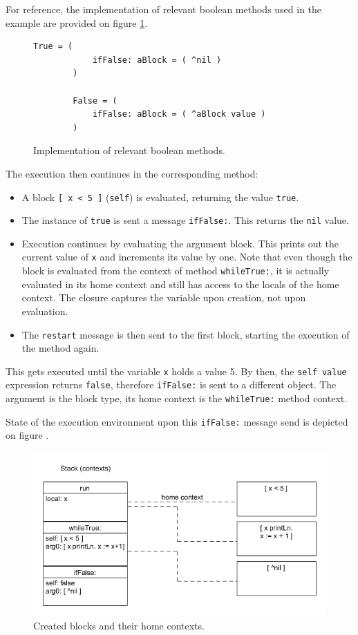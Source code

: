 \documentclass[thesis=M,english]{FITthesis}[2019/12/23]
\begin{document}
For reference, the implementation of relevant boolean methods used in the example are provided on figure \ref{fig:bool_ifFalse}.
\begin{figure}[h!]
	\begin{lstlisting}[language=Smalltalk]
		True = (
			ifFalse: aBlock = ( ^nil )
		)

		False = (
			ifFalse: aBlock = ( ^aBlock value )
		)
	\end{lstlisting}
	\caption{Implementation of relevant boolean methods.}
	\label{fig:bool_ifFalse}
\end{figure}

The execution then continues in the corresponding method:
\begin{itemize}
	\item A block \texttt{[ x < 5 ]} (\texttt{self}) is evaluated, returning the value \texttt{true}.
	\item The instance of \texttt{true} is sent a message \texttt{ifFalse:}. This returns the \texttt{nil} value.
	\item Execution continues by evaluating the argument block. This prints out the current value of \texttt{x} and
		increments its value by one. Note that even though the block is evaluated from the context of method
		\texttt{whileTrue:}, it is actually evaluated in its home context and still has access to the locals of 
		the home context. The closure captures the variable upon creation, not upon evaluation.
	\item The \texttt{restart} message is then sent to the first block, starting the execution of the method again.
\end{itemize}

This gets executed until the variable \texttt{x} holds a value 5. By then, the \texttt{self value} expression returns
\texttt{false}, therefore \texttt{ifFalse:} is sent to a different object. The argument is the block type, its home context
is the \texttt{whileTrue:} method context.

State of the execution environment upon this \texttt{ifFalse:} message send is depicted on figure .
\begin{figure}[h!]
	\centering
	\includegraphics[width=\linewidth]{media/nlreturn_ex1.png}
	\caption{Created blocks and their home contexts.}
	\label{fig:nlreturn_ctx_1}
\end{figure}
\end{document}
